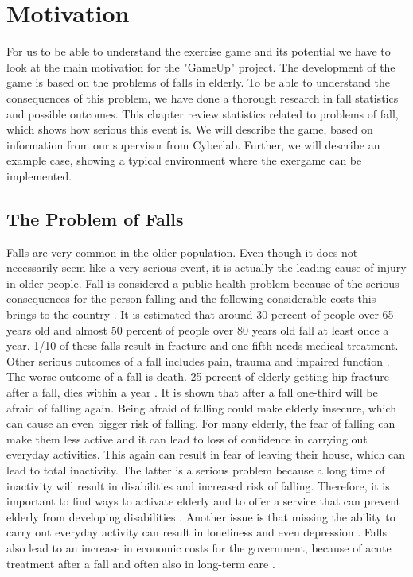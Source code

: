 \chapter{Motivation}
For us to be able to understand the exercise game and its potential we have to look at the main motivation for the "GameUp" project. The development of the game is based on the problems of falls in elderly. To be able to understand the consequences of this problem, we have done a thorough research in fall statistics and possible outcomes. This chapter review statistics related to problems of fall, which shows how serious this event is. We will describe the game, based on information from our supervisor from Cyberlab. Further, we will describe an example case, showing a typical environment where the exergame can be implemented.  
\section{The Problem of Falls}
Falls are very common in the older population. Even though it does not necessarily seem like a very serious event, it is actually the leading cause of injury in older people.  Fall is considered a public health problem because of the serious consequences for the person falling and the following considerable costs this brings to the country \cite{otago}.
It is estimated that around 30 percent of people over 65 years old and almost 50 percent of people over 80 years old fall at least once a year. 1/10 of these falls result in fracture and one-fifth needs medical treatment. Other serious outcomes of a fall includes pain, trauma and impaired function \cite{otago}.  The worse outcome of a fall is death. 25 percent of elderly getting hip fracture after a fall, dies within a year \cite{gruppetrening-trheim} \cite{larhalsbrudd}. It is shown that after a fall one-third will be afraid of falling again. Being afraid of falling could make elderly insecure, which can cause an even bigger risk of falling. For many elderly, the fear of falling can make them less active and it can lead to loss of confidence in carrying out everyday activities. This again can result in fear of leaving their house, which can lead to total inactivity. The latter is a serious problem because a long time of inactivity will result in disabilities and increased risk of falling. Therefore, it is important to find ways to activate elderly and to offer a service that can prevent elderly from developing disabilities \cite{gruppetrening-trheim}. Another issue is that missing the ability to carry out everyday activity can result in loneliness and even depression \cite{exergamesforelderly}. Falls also lead to an increase in economic costs for the government, because of acute treatment after a fall and often also in long-term care \cite{otago}.\\ \\

